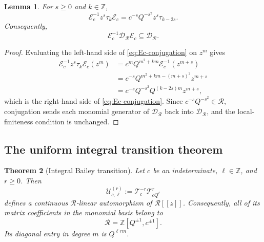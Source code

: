 \documentclass[11pt]{amsart}
\newtheorem{theorem}{Theorem}[section]
\newtheorem{lemma}[theorem]{Lemma}
\newcommand{\Z}{\mathbb Z}
\begin{document}
\begin{lemma}\label{lem:Ec-conjugation}
For \(s\geq0\) and \(k\in\Z\),
\begin{equation}\label{eq:Ec-conjugation}
\mathcal E_c^{-1}z^s\tau_k\mathcal E_c
=
c^{-s}Q^{-s^2}z^s\tau_{k-2s}.
\end{equation}
Consequently,
\begin{equation}\label{eq:Ec-preserves-D}
\mathcal E_c^{-1}\mathscr D_{\mathscr R}\mathcal E_c
\subseteq
\mathscr D_{\mathscr R}.
\end{equation}
\end{lemma}

\begin{proof}
Evaluating the left-hand side of \eqref{eq:Ec-conjugation} on \(z^m\)
gives
\begin{align*}
\mathcal E_c^{-1}z^s\tau_k\mathcal E_c(z^m)
&=
c^mQ^{m^2+km}
\mathcal E_c^{-1}(z^{m+s})
\\
&=
c^{-s}Q^{m^2+km-(m+s)^2}z^{m+s}
\\
&=
c^{-s}Q^{-s^2}Q^{(k-2s)m}z^{m+s},
\end{align*}
which is the right-hand side of \eqref{eq:Ec-conjugation}.  Since
\(c^{-s}Q^{-s^2}\in\mathscr R\), conjugation sends each monomial
generator of \(\mathscr D_{\mathscr R}\) back into
\(\mathscr D_{\mathscr R}\), and the local-finiteness condition is
unchanged.
\end{proof}

\subsection{The uniform integral transition theorem}

\begin{theorem}[Integral Bailey transition]
\label{thm:general-integral-transition}
Let \(c\) be an indeterminate, \(\ell\in\Z\), and \(r\geq0\).  Then
\[
\mathcal U_{c,\ell}^{(r)}
:=
\mathcal T_c^{-r}\mathcal T_{cQ^\ell}^{r}
\]
defines a continuous \(\mathscr R\)-linear automorphism of
\(\mathscr R[[z]]\).  Consequently, all of its matrix coefficients in
the monomial basis belong to
\[
\mathscr R=\Z[Q^{\pm1},c^{\pm1}].
\]
Its diagonal entry in degree \(m\) is \(Q^{\ell rm}\).
\end{theorem}
\end{document}

